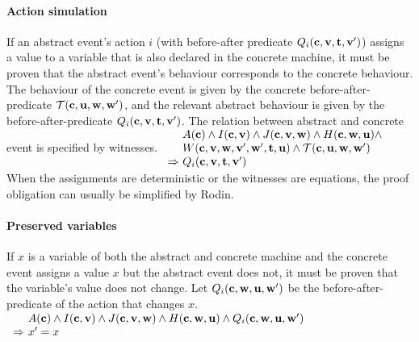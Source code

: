 \paragraph{Action simulation}
\label{action_simulation}
If an abstract event's action $i$ (with before-after predicate $Q_i(\mathbf{c},\mathbf{v},\mathbf{t},\mathbf{v}')$)
  assigns a value to a variable that is also declared in the concrete machine,
  it must be proven that the abstract event's behaviour
  corresponds to the concrete behaviour.
The behaviour of the concrete event is given by the concrete before-after-predicate $\mathcal{T}(\mathbf{c},\mathbf{u},\mathbf{w},\mathbf{w}')$, and
the relevant abstract behaviour is given by the before-after-predicate $Q_i(\mathbf{c},\mathbf{v},\mathbf{t},\mathbf{v}')$.
The relation between abstract and concrete event is specified by witnesses.
%
  {}%
  {$\begin{array}{r@{\ }l}
      & \axioms \land \absinvariants \land \concinvariants 
      \land \concguards \land \\
      & \witnesspred \land \bapred \\
      \limp & Q_i(\allconstants,\absvariables,\absparameters,\absvariables')
    \end{array}$}
When the assignments are deterministic or the witnesses are equations, the proof obligation can usually
be simplified by Rodin.

\paragraph{Preserved variables}
\label{preserved_variables}
If $x$ is a variable of both the abstract and concrete machine and
  the concrete event assigns a value $x$ but the abstract event does not,
  it must be proven that the variable's value does not change.
Let $Q_i(\mathbf{c},\mathbf{w},\mathbf{u},\mathbf{w}')$ be the before-after-predicate
  of the action that changes $x$.
%
  {}%
  {$\begin{array}{r@{\ }l}
      & \axioms \land \absinvariants \land \concinvariants 
      \land \concguards
      \land Q_i(\allconstants,\concvariables,\concparameters,\concvariables') \\
      \limp & x'=x      
    \end{array}$}

